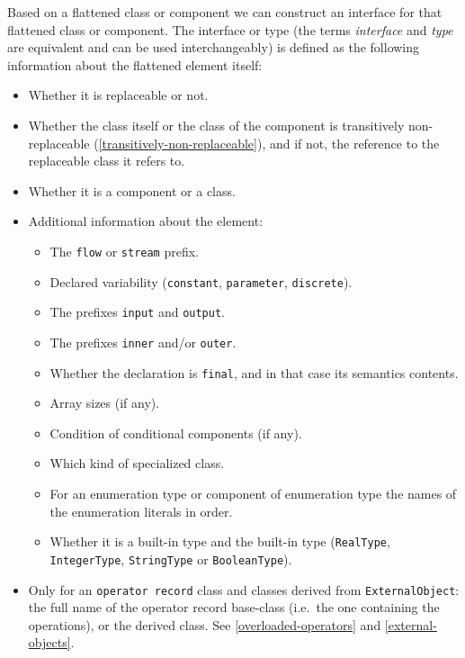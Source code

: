 Based on a flattened class or component we can construct an interface
for that flattened class or component. The interface or type
(the terms \emph{interface} and \emph{type} are equivalent and can be used
interchangeably) is defined as the following information about the
flattened element itself:
\begin{itemize}
\item
  Whether it is replaceable or not.
\item
  Whether the class itself or the class of the component is transitively
  non-replaceable (\autoref{transitively-non-replaceable}), and if not, the reference to the
  replaceable class it refers to.
\item
  Whether it is a component or a class.
\item
  Additional information about the element:

  \begin{itemize}
  \item
    The \lstinline!flow! or \lstinline!stream! prefix.
  \item
    Declared variability (\lstinline!constant!, \lstinline!parameter!, \lstinline!discrete!).
  \item
    The prefixes \lstinline!input! and \lstinline!output!.
  \item
    The prefixes \lstinline!inner! and/or \lstinline!outer!.
  \item
    Whether the declaration is \lstinline!final!, and in that case its semantics
    contents.
  \item
    Array sizes (if any).
  \item
    Condition of conditional components (if any).
  \item
    Which kind of specialized class.
  \item
    For an enumeration type or component of enumeration type the names
    of the enumeration literals in order.
  \item
    Whether it is a built-in type and the built-in type (\lstinline!RealType!,
    \lstinline!IntegerType!, \lstinline!StringType! or \lstinline!BooleanType!).
  \end{itemize}
\item
  Only for an \lstinline!operator record! class and classes derived from \lstinline!ExternalObject!: the full name of the operator record base-class
  (i.e.\  the one containing the operations), or the derived class.  See \autoref{overloaded-operators} and \autoref{external-objects}.


\end{itemize}
